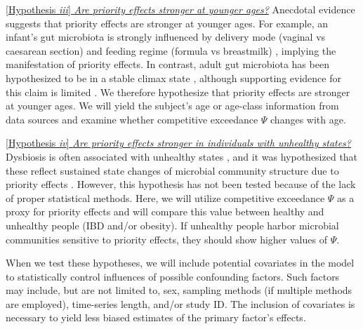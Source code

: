 \documentclass[12pt, class=article, crop=false]{standalone}
\begin{document}
\ul{[Hypothesis \textit{iii}] \textit{Are priority effects stronger at younger ages?}}
Anecdotal evidence suggests that priority effects are stronger at younger ages.
For example, an infant's gut microbiota is strongly influenced by delivery mode (vaginal vs caesarean section) and feeding regime (formula vs breastmilk) \citep{bokulich_antibiotics_2016, akagawa_effect_2019, dominguez-bello_delivery_2010}, implying the manifestation of priority effects.
In contrast, adult gut microbiota has been hypothesized to be in a stable climax state \citep{fierer_animalcules_2012, costello_application_2012}, although supporting evidence for this claim is limited \citep{fierer_animalcules_2012}.
We therefore hypothesize that priority effects are stronger at younger ages.
We will yield the subject's age or age-class information from data sources and examine whether competitive exceedance $\Psi$ changes with age.

\ul{[Hypothesis \textit{iv}] \textit{Are priority effects stronger in individuals with unhealthy states?}}
Dysbiosis is often associated with unhealthy states \citep{petersen_defining_2014, fierer_animalcules_2012}, and it was hypothesized that these reflect sustained state changes of microbial community structure due to priority effects \citep{fierer_animalcules_2012}.
However, this hypothesis has not been tested because of the lack of proper statistical methods.
Here, we will utilize competitive exceedance $\Psi$ as a proxy for priority effects and will compare this value between healthy and unhealthy people (IBD and/or obesity).
If unhealthy people harbor microbial communities sensitive to priority effects, they should show higher values of $\Psi$.

When we test these hypotheses, we will include potential covariates in the model to statistically control influences of possible confounding factors.
Such factors may include, but are not limited to, sex, sampling methods (if multiple methods are employed), time-series length, and/or study ID.
The inclusion of covariates is necessary to yield less biased estimates of the primary factor's effects.
\end{document}
